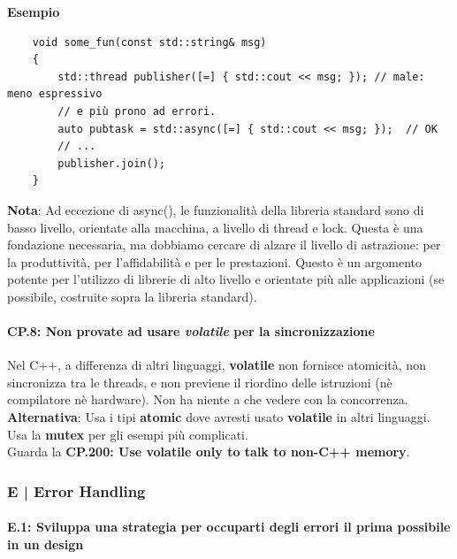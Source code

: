 \textsf{\small \textbf{Esempio}}

\begin{lstlisting}
	void some_fun(const std::string& msg)
	{
		std::thread publisher([=] { std::cout << msg; }); // male: meno espressivo
		// e più prono ad errori.
		auto pubtask = std::async([=] { std::cout << msg; });  // OK
		// ...
		publisher.join();
	}
\end{lstlisting}

\textsf{\small \textbf{Nota}: Ad eccezione di async(), le funzionalità della libreria standard sono di basso livello, orientate alla macchina, a livello di thread e lock. Questa è una fondazione necessaria, ma dobbiamo cercare di alzare il livello di astrazione: per la produttività, per l'affidabilità e per le prestazioni. Questo è un argomento potente per l'utilizzo di librerie di alto livello e orientate più alle applicazioni (se possibile, costruite sopra la libreria standard).} \\

\paragraph{CP.8: Non provate ad usare \emph{volatile} per la sincronizzazione}

\textsf{\small Nel C++, a differenza di altri linguaggi, \textbf{volatile} non fornisce atomicità, non sincronizza tra le threads, e non previene il riordino delle istruzioni (nè compilatore nè hardware). Non ha niente a che vedere con la concorrenza.} \\

\textsf{\small \textbf{Alternativa}: Usa i tipi \textbf{atomic} dove avresti usato \textbf{volatile} in altri linguaggi. Usa la \textbf{mutex} per gli esempi più complicati.} \\

\textsf{\small Guarda la \textbf{CP.200: Use volatile only to talk to non-C++ memory}.}



\newpage

\subsubsection{E | Error Handling}

\paragraph{E.1: Sviluppa una strategia per occuparti degli errori il prima possibile in un design}

